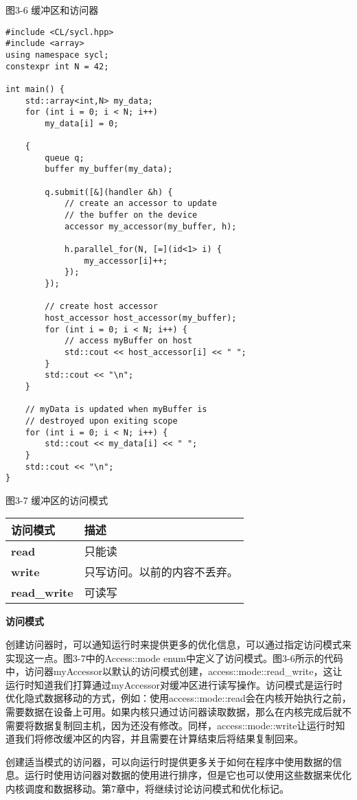 \hspace*{\fill} \par %
图3-6 缓冲区和访问器
\begin{lstlisting}[caption={}]
#include <CL/sycl.hpp>
#include <array>
using namespace sycl;
constexpr int N = 42;

int main() {
	std::array<int,N> my_data;
	for (int i = 0; i < N; i++)
		my_data[i] = 0;
	
	{
		queue q;
		buffer my_buffer(my_data);
		
		q.submit([&](handler &h) {
			// create an accessor to update
			// the buffer on the device
			accessor my_accessor(my_buffer, h);
			
			h.parallel_for(N, [=](id<1> i) {
				my_accessor[i]++;
			});
		});
	
		// create host accessor
		host_accessor host_accessor(my_buffer);
		for (int i = 0; i < N; i++) {
			// access myBuffer on host
			std::cout << host_accessor[i] << " ";
		}
		std::cout << "\n";
	}

	// myData is updated when myBuffer is
	// destroyed upon exiting scope
	for (int i = 0; i < N; i++) {
		std::cout << my_data[i] << " ";
	}
	std::cout << "\n";
}
\end{lstlisting}

\hspace*{\fill} \par %
图3-7 缓冲区的访问模式
\begin{table}[H]
	\begin{tabular}{|l|l|}
		\hline
		\textbf{访问模式} & \textbf{描述}                                \\ \hline
		\textbf{read}        & 只能读                                   \\ \hline
		\textbf{write}       & 只写访问。以前的内容不丢弃。 \\ \hline
		\textbf{read\_write} & 可读写              \\ \hline
	\end{tabular}
\end{table}

\hspace*{\fill} \par %
\textbf{访问模式}

创建访问器时，可以通知运行时来提供更多的优化信息，可以通过指定访问模式来实现这一点。图3-7中的Access::mode enum中定义了访问模式。图3-6所示的代码中，访问器myAccessor以默认的访问模式创建，access::mode::read\_write，这让运行时知道我们打算通过myAccessor对缓冲区进行读写操作。访问模式是运行时优化隐式数据移动的方式，例如：使用access::mode::read会在内核开始执行之前，需要数据在设备上可用。如果内核只通过访问器读取数据，那么在内核完成后就不需要将数据复制回主机，因为还没有修改。同样，access::mode::write让运行时知道我们将修改缓冲区的内容，并且需要在计算结束后将结果复制回来。\par

创建适当模式的访问器，可以向运行时提供更多关于如何在程序中使用数据的信息。运行时使用访问器对数据的使用进行排序，但是它也可以使用这些数据来优化内核调度和数据移动。第7章中，将继续讨论访问模式和优化标记。\par










